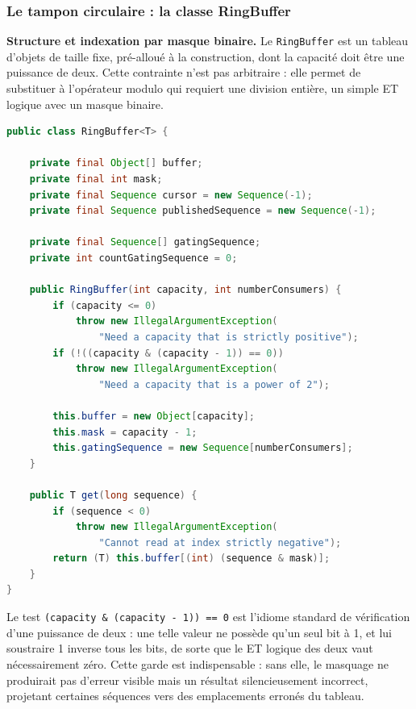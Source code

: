 \subsubsection{Le tampon circulaire : la classe RingBuffer}

\textbf{Structure et indexation par masque binaire.} Le \texttt{RingBuffer} est un tableau d'objets de taille fixe, pré-alloué à la construction, dont la capacité doit être une puissance de deux. Cette contrainte n'est pas arbitraire : elle permet de substituer à l'opérateur modulo qui requiert une division entière, un simple ET logique avec un masque binaire.

\begin{lstlisting}[language=Java, caption={Structure du Ring Buffer et validation de capacité}]
public class RingBuffer<T> {

    private final Object[] buffer;
    private final int mask;
    private final Sequence cursor = new Sequence(-1);
    private final Sequence publishedSequence = new Sequence(-1);

    private final Sequence[] gatingSequence;
    private int countGatingSequence = 0;

    public RingBuffer(int capacity, int numberConsumers) {
        if (capacity <= 0)
            throw new IllegalArgumentException(
                "Need a capacity that is strictly positive");
        if (!((capacity & (capacity - 1)) == 0))
            throw new IllegalArgumentException(
                "Need a capacity that is a power of 2");

        this.buffer = new Object[capacity];
        this.mask = capacity - 1;
        this.gatingSequence = new Sequence[numberConsumers];
    }

    public T get(long sequence) {
        if (sequence < 0)
            throw new IllegalArgumentException(
                "Cannot read at index strictly negative");
        return (T) this.buffer[(int) (sequence & mask)];
    }
}
\end{lstlisting}

Le test \texttt{(capacity \& (capacity - 1)) == 0} est l'idiome standard de vérification d'une puissance de deux : une telle valeur ne possède qu'un seul bit à 1, et lui soustraire 1 inverse tous les bits, de sorte que le ET logique des deux vaut nécessairement zéro. Cette garde est indispensable : sans elle, le masquage ne produirait pas d'erreur visible mais un résultat silencieusement incorrect, projetant certaines séquences vers des emplacements erronés du tableau.


